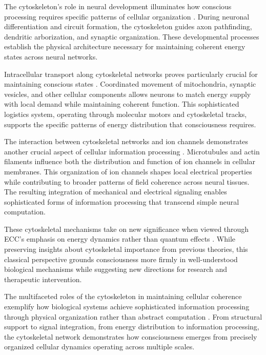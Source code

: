 The cytoskeleton's role in neural development illuminates how conscious processing requires specific patterns of cellular organization \cite{Stiess2011}. During neuronal differentiation and circuit formation, the cytoskeleton guides axon pathfinding, dendritic arborization, and synaptic organization. These developmental processes establish the physical architecture necessary for maintaining coherent energy states across neural networks.

Intracellular transport along cytoskeletal networks proves particularly crucial for maintaining conscious states \cite{Vallee2006}. Coordinated movement of mitochondria, synaptic vesicles, and other cellular components allows neurons to match energy supply with local demand while maintaining coherent function. This sophisticated logistics system, operating through molecular motors and cytoskeletal tracks, supports the specific patterns of energy distribution that consciousness requires.

The interaction between cytoskeletal networks and ion channels demonstrates another crucial aspect of cellular information processing \cite{Conde2009}. Microtubules and actin filaments influence both the distribution and function of ion channels in cellular membranes. This organization of ion channels shapes local electrical properties while contributing to broader patterns of field coherence across neural tissues. The resulting integration of mechanical and electrical signaling enables sophisticated forms of information processing that transcend simple neural computation.

These cytoskeletal mechanisms take on new significance when viewed through ECC's emphasis on energy dynamics rather than quantum effects \cite{Baas2011}. While preserving insights about cytoskeletal importance from previous theories, this classical perspective grounds consciousness more firmly in well-understood biological mechanisms while suggesting new directions for research and therapeutic intervention.

The multifaceted roles of the cytoskeleton in maintaining cellular coherence exemplify how biological systems achieve sophisticated information processing through physical organization rather than abstract computation \cite{Fletcher2010}. From structural support to signal integration, from energy distribution to information processing, the cytoskeletal network demonstrates how consciousness emerges from precisely organized cellular dynamics operating across multiple scales.

